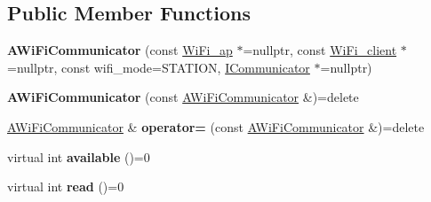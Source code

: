 \subsection*{Public Member Functions}
\begin{DoxyCompactItemize}
\item 
\mbox{\label{classwood_box_1_1communication_1_1_a_wi_fi_communicator_a1c4f2b3c6f0f33ab9bbdf7ce57fb2f73}} 
{\bfseries A\+Wi\+Fi\+Communicator} (const \mbox{\hyperlink{structs__wifi__access__point}{Wi\+Fi\+\_\+ap}} $\ast$=nullptr, const \mbox{\hyperlink{structs__wifi__client}{Wi\+Fi\+\_\+client}} $\ast$=nullptr, const wifi\+\_\+mode=S\+T\+A\+T\+I\+ON, \mbox{\hyperlink{classwood_box_1_1communication_1_1_i_communicator}{I\+Communicator}} $\ast$=nullptr)
\item 
\mbox{\label{classwood_box_1_1communication_1_1_a_wi_fi_communicator_a28a5a926502fb97fe411a612a00a151f}} 
{\bfseries A\+Wi\+Fi\+Communicator} (const \mbox{\hyperlink{classwood_box_1_1communication_1_1_a_wi_fi_communicator}{A\+Wi\+Fi\+Communicator}} \&)=delete
\item 
\mbox{\label{classwood_box_1_1communication_1_1_a_wi_fi_communicator_aaa89497f34685a1cd30df186c5495ec2}} 
\mbox{\hyperlink{classwood_box_1_1communication_1_1_a_wi_fi_communicator}{A\+Wi\+Fi\+Communicator}} \& {\bfseries operator=} (const \mbox{\hyperlink{classwood_box_1_1communication_1_1_a_wi_fi_communicator}{A\+Wi\+Fi\+Communicator}} \&)=delete
\item 
\mbox{\label{classwood_box_1_1communication_1_1_a_wi_fi_communicator_a6457335424411ffcf7da60f515a61a09}} 
virtual int {\bfseries available} ()=0
\item 
\mbox{\label{classwood_box_1_1communication_1_1_a_wi_fi_communicator_ac0d9aa9197a4a10b0a4946229c429528}} 
virtual int {\bfseries read} ()=0
\item 
\mbox{\label{classwood_box_1_1communication_1_1_a_wi_fi_communicator_aa3704b02b59abdda77eebe1b6f76aa6c}} 

\end{DoxyCompactItemize}
